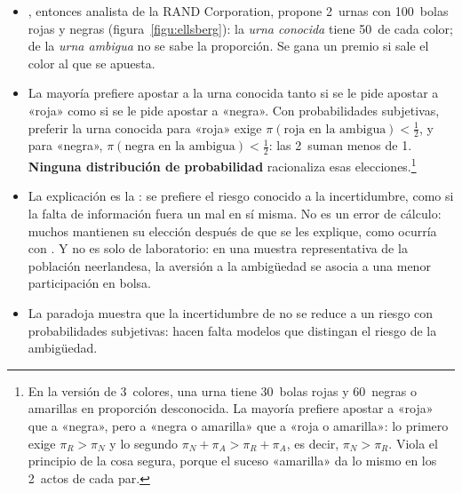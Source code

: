 \documentclass[11pt]{article}
\begin{document}
\begin{itemize}
\item \textcite{Ellsberg1961Risk}, entonces analista de la RAND Corporation, propone 2~urnas con 100~bolas rojas y negras (figura~\ref{figu:ellsberg}): la \emph{urna conocida} tiene 50~de cada color; de la \emph{urna ambigua} no se sabe la proporción. Se gana un premio si sale el color al que se apuesta.
\item La mayoría prefiere apostar a la urna conocida tanto si se le pide apostar a «roja» como si se le pide apostar a «negra». Con probabilidades subjetivas, preferir la urna conocida para «roja» exige $\pi(\text{roja en la ambigua})<\tfrac12$, y para «negra», $\pi(\text{negra en la ambigua})<\tfrac12$: las 2~suman menos de 1. \textbf{Ninguna distribución de probabilidad} racionaliza esas elecciones.\footnote{En la versión de 3~colores, una urna tiene 30~bolas rojas y 60~negras o amarillas en proporción desconocida. La mayoría prefiere apostar a «roja» que a «negra», pero a «negra o amarilla» que a «roja o amarilla»: lo primero exige $\pi_R>\pi_N$ y lo segundo $\pi_N+\pi_A>\pi_R+\pi_A$, es decir, $\pi_N>\pi_R$. Viola el principio de la cosa segura, porque el suceso «amarilla» da lo mismo en los 2~actos de cada par\nocite{Ellsberg1961Risk}.}
\item La explicación es la : se prefiere el riesgo conocido a la incertidumbre, como si la falta de información fuera un mal en sí misma. No es un error de cálculo: muchos mantienen su elección después de que se les explique, como ocurría con . Y no es solo de laboratorio: en una muestra representativa de la población neerlandesa, la aversión a la ambigüedad se asocia a una menor participación en bolsa\nocite{DimmockKouwenbergWakker2016Ambiguity}.
\item La paradoja muestra que la incertidumbre de  no se reduce a un riesgo con probabilidades subjetivas: hacen falta modelos que distingan el riesgo de la ambigüedad.
\end{itemize}

\begin{infografia}[H]
\centering
\caption{La paradoja de Ellsberg: urna conocida y urna ambigua}\label{figu:ellsberg}
\end{infografia}

\end{document}
